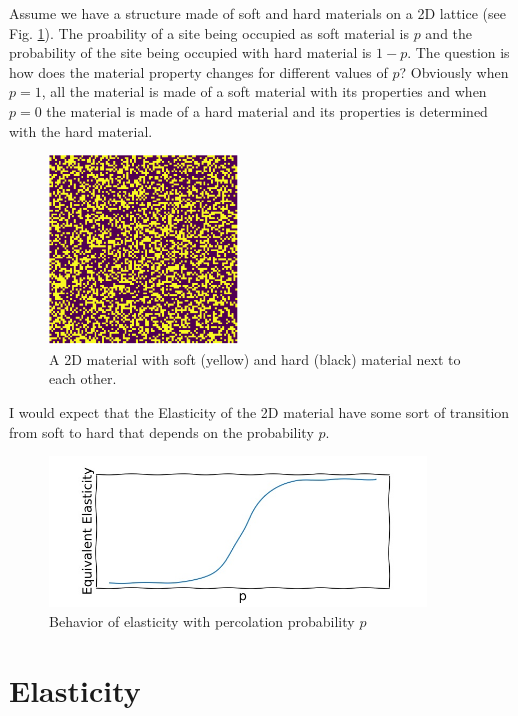 Assume we have a structure made of soft and hard materials on a 2D
lattice (see Fig. \ref{fig-soft-hard}). The proability of a site being
occupied as soft material is $p$ and the probability of the site being
occupied with hard material is $1-p$. The question is how does the
material property changes for different values of $p$? Obviously when
$p=1$, all the material is made of a soft material with its properties
and when $p=0$ the material is made of a hard material and its
properties is determined with the hard material. 

\begin{figure}[h]
  \centering
  \includegraphics[width=5cm]{Figs/percolation-first}
  \caption{A 2D material with soft (yellow) and hard (black) material
    next to each other.} \label{fig-soft-hard}
\end{figure}


I would expect that the Elasticity of the 2D material have some sort
of transition from soft to hard that depends on the probability $p$. 

\begin{figure}[h]
  \centering
  \includegraphics[width=10cm]{Figs/elasticity-percolation}
  \caption{Behavior of elasticity with percolation probability $p$} \label{fig-elasticity-percolation}
\end{figure}



\section{Elasticity}

